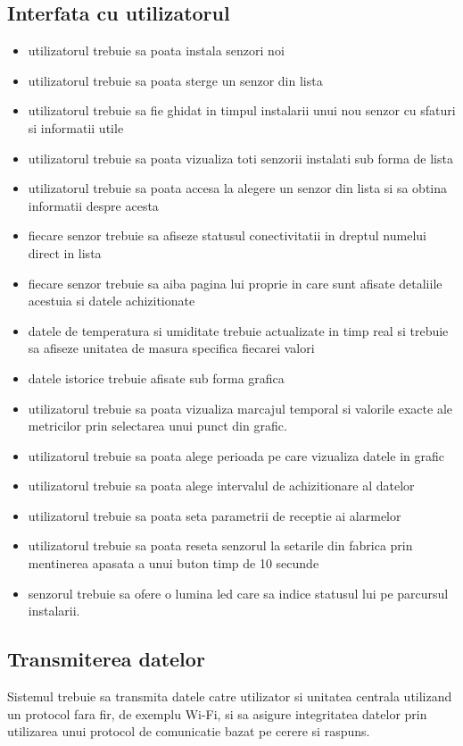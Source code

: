 \subsection{Interfata cu utilizatorul}\label{subsec:cf_interfata}
\begin{itemize}
    \item utilizatorul trebuie sa poata instala senzori noi
    \item utilizatorul trebuie sa poata sterge un senzor din lista 
    \item utilizatorul trebuie sa fie ghidat in timpul instalarii unui nou senzor cu sfaturi si informatii utile
    \item utilizatorul trebuie sa poata vizualiza toti senzorii instalati sub forma de lista
    \item utilizatorul trebuie sa poata accesa la alegere un senzor din lista si sa obtina informatii despre acesta
    \item fiecare senzor trebuie sa afiseze statusul conectivitatii in dreptul numelui direct in lista
    \item fiecare senzor trebuie sa aiba pagina lui proprie in care sunt afisate detaliile acestuia si datele achizitionate 
    \item datele de temperatura si umiditate trebuie actualizate in timp real si trebuie sa afiseze unitatea de masura specifica fiecarei valori
    \item datele istorice trebuie afisate sub forma grafica
    \item utilizatorul trebuie sa poata vizualiza marcajul temporal si valorile exacte ale metricilor prin selectarea unui punct din grafic.
    \item utilizatorul trebuie sa poata alege perioada pe care vizualiza datele in grafic
    \item utilizatorul trebuie sa poata alege intervalul de achizitionare al datelor
    \item utilizatorul trebuie sa poata seta parametrii de receptie ai alarmelor
    \item utilizatorul trebuie sa poata reseta senzorul la setarile din fabrica prin mentinerea apasata a unui buton timp de 10 secunde 
    \item senzorul trebuie sa ofere o lumina led care sa indice statusul lui pe parcursul instalarii.
\end{itemize}

\subsection{Transmiterea datelor}\label{subsec:cf_transmitere}
Sistemul trebuie sa transmita datele catre utilizator si unitatea centrala utilizand un protocol fara fir, de exemplu Wi-Fi, si sa asigure integritatea 
datelor prin utilizarea unui protocol de comunicatie bazat pe cerere si raspuns.
 
